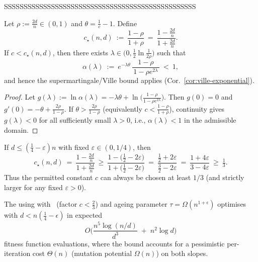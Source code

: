 \documentclass[lettersize,journal]{IEEEtran}
\begin{document}
SSSSSSSSSSSSSSSSSSSSSSSSSSSSSSSSSSSSSSSSSSSSSSSSS

\begin{lemma}\label{lem:c-threshold-instance}
	Let $\rho:=\tfrac{2d}{n}\in(0,1)$ and $\theta=\tfrac{1}{c}-1$. Define
	\[
	c_\star(n,d)\ :=\ \frac{1-\rho}{1+\rho}\ =\ \frac{1-\tfrac{2d}{n}}{1+\tfrac{2d}{n}}.
	\]
	If $c<c_\star(n,d)$, then there exists $\lambda\in\!\big(0,\tfrac12\ln\tfrac{1}{2\rho}\big)$ such that
	\[
	\alpha(\lambda)\ :=\ e^{-\lambda\theta}\,\frac{1-\rho}{\,1-\rho e^{2\lambda}\,}\ <\ 1,
	\]
	and hence the supermartingale/Ville bound applies (Cor.~\ref{cor:ville-exponential}).
\end{lemma}

\begin{proof}
	Let $g(\lambda):=\ln\alpha(\lambda)=-\lambda\theta+\ln\!\big(\tfrac{1-\rho}{1-\rho e^{2\lambda}}\big)$. 
	Then $g(0)=0$ and $g'(0)=-\theta+\tfrac{2\rho}{1-\rho}$. 
	If $\theta>\tfrac{2\rho}{1-\rho}$ (equivalently $c<\tfrac{1-\rho}{1+\rho}$), continuity gives $g(\lambda)<0$ for all sufficiently small $\lambda>0$, i.e., $\alpha(\lambda)<1$ in the admissible domain.
\end{proof}

\begin{corollary}\label{cor:c-floor}
	If $d\le (\tfrac14-\varepsilon)n$ with fixed $\varepsilon\in(0,1/4)$, then
	\[
	c_\star(n,d)\ =\ \frac{1-\tfrac{2d}{n}}{1+\tfrac{2d}{n}}
	\ \ge\ \frac{1-\bigl(\tfrac12-2\varepsilon\bigr)}{1+\bigl(\tfrac12-2\varepsilon\bigr)}
	\ =\ \frac{\tfrac12+2\varepsilon}{\tfrac32-2\varepsilon}
	\ =\ \frac{1+4\varepsilon}{3-4\varepsilon}\ \ge\ \tfrac13.
	\]
	Thus the permitted constant $c$ can always be chosen at least $1/3$ (and strictly larger for any fixed $\varepsilon>0$).
\end{corollary}
\begin{theorem}\label{th:expoHD-cliff}
	The {\oneoneOPTIA} using \IPHfcm{} with \linHD\ (factor $c<\tfrac{2}{3}$) and ageing parameter $\tau=\Omega(n^{1+\epsilon})$
	optimises \cliff{} with $d<n(\tfrac{1}{4}-\epsilon)$ in expected
	\[
	O\!\Big(\frac{n^{5}\log(n/d)}{d^{3}} \;+\; n^{2}\log d\Big)
	\]
	fitness function evaluations, where the bound accounts for a pessimistic per-iteration cost $\Theta(n)$ (mutation potential $\Omega(n)$) on both slopes.
\end{theorem}
\end{document}
